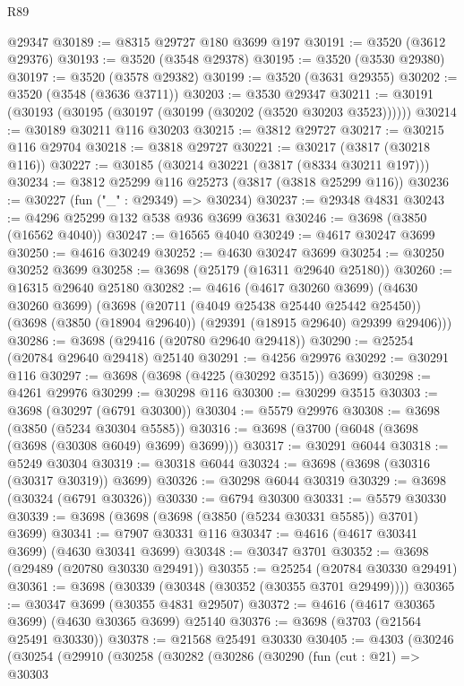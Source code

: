 \begin{lexlean}{R89}
\begin{coremodule}
    @29347
@30189 := @8315 @29727 @180 @3699 @197
@30191 := @3520 (@3612 @29376)
@30193 := @3520 (@3548 @29378)
@30195 := @3520 (@3530 @29380)
@30197 := @3520 (@3578 @29382)
@30199 := @3520 (@3631 @29355)
@30202 := @3520 (@3548 (@3636 @3711))
@30203 := @3530 @29347
@30211 := @30191 (@30193 (@30195 (@30197 (@30199 (@30202 (@3520 @30203 @3523))))))
@30214 := @30189 @30211 @116 @30203
@30215 := @3812 @29727
@30217 := @30215 @116 @29704
@30218 := @3818 @29727
@30221 := @30217 (@3817 (@30218 @116))
@30227 := @30185 (@30214 @30221 (@3817 (@8334 @30211 @197)))
@30234 := @3812 @25299 @116 @25273 (@3817 (@3818 @25299 @116))
@30236 := @30227 (fun ("_" : @29349) => @30234)
@30237 := @29348 @4831
@30243 := @4296 @25299 @132 @538 @936 @3699 @3631
@30246 := @3698 (@3850 (@16562 @4040))
@30247 := @16565 @4040
@30249 := @4617 @30247 @3699
@30250 := @4616 @30249
@30252 := @4630 @30247 @3699
@30254 := @30250 @30252 @3699
@30258 := @3698 (@25179 (@16311 @29640 @25180))
@30260 := @16315 @29640 @25180
@30282 := @4616
    (@4617 @30260 @3699)
    (@4630 @30260 @3699)
    (@3698
      (@20711 (@4049 @25438 @25440 @25442 @25450))
      (@3698 (@3850 (@18904 @29640)) (@29391 (@18915 @29640) @29399 @29406)))
@30286 := @3698 (@29416 (@20780 @29640 @29418))
@30290 := @25254 (@20784 @29640 @29418) @25140
@30291 := @4256 @29976
@30292 := @30291 @116
@30297 := @3698 (@3698 (@4225 (@30292 @3515)) @3699)
@30298 := @4261 @29976
@30299 := @30298 @116
@30300 := @30299 @3515
@30303 := @3698 (@30297 (@6791 @30300))
@30304 := @5579 @29976
@30308 := @3698 (@3850 (@5234 @30304 @5585))
@30316 := @3698 (@3700 (@6048 (@3698 (@3698 (@30308 @6049) @3699) @3699)))
@30317 := @30291 @6044
@30318 := @5249 @30304
@30319 := @30318 @6044
@30324 := @3698 (@3698 (@30316 (@30317 @30319)) @3699)
@30326 := @30298 @6044 @30319
@30329 := @3698 (@30324 (@6791 @30326))
@30330 := @6794 @30300
@30331 := @5579 @30330
@30339 := @3698 (@3698 (@3698 (@3850 (@5234 @30331 @5585)) @3701) @3699)
@30341 := @7907 @30331 @116
@30347 := @4616 (@4617 @30341 @3699) (@4630 @30341 @3699)
@30348 := @30347 @3701
@30352 := @3698 (@29489 (@20780 @30330 @29491))
@30355 := @25254 (@20784 @30330 @29491)
@30361 := @3698 (@30339 (@30348 (@30352 (@30355 @3701 @29499))))
@30365 := @30347 @3699 (@30355 @4831 @29507)
@30372 := @4616 (@4617 @30365 @3699) (@4630 @30365 @3699) @25140
@30376 := @3698 (@3703 (@21564 @25491 @30330))
@30378 := @21568 @25491 @30330
@30405 := @4303
    (@30246
      (@30254
        (@29910
          (@30258
            (@30282
              (@30286
                (@30290
                  (fun (cut : @21) =>
                  @30303

\end{coremodule}
\end{lexlean}
